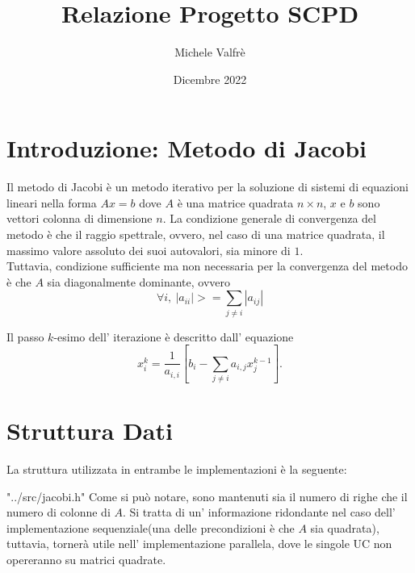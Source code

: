 \documentclass[twocolumn]{article}
\title{Relazione Progetto SCPD}
\date{Dicembre 2022}
\author{Michele Valfrè}
\begin{document}
	\maketitle
	\section{Introduzione: Metodo di Jacobi}
	Il metodo di Jacobi è un metodo iterativo per la soluzione di sistemi di equazioni lineari nella forma $Ax=b$ dove $A$ è una matrice quadrata $n\times n$, $x$ e $b$ sono vettori colonna di dimensione $n$. 
	La condizione generale di convergenza del metodo è che il raggio spettrale, ovvero, nel caso di una matrice quadrata, il massimo valore assoluto dei suoi autovalori, sia minore di $1$.\\
	Tuttavia, condizione sufficiente ma non necessaria per la convergenza del metodo è che $A$ sia diagonalmente dominante, ovvero
	\begin{equation}\label{f1}
		\forall i,\ |a_{ii}| >= \sum_{j \neq i} |a_{ij}| 
	\end{equation}
	
	Il passo $k$-esimo dell' iterazione è descritto dall' equazione
	\begin{equation}\label{f2}
		x^{k}_i = \frac{1}{a_{i,i}}[b_i  - \sum_{j\neq i}a_{i,j}x^{k-1}_j].
	\end{equation}
	\section{Struttura Dati}
	La struttura utilizzata in entrambe le implementazioni è la seguente:
	
	{"../src/jacobi.h"} \label{lin_sys_struct}
	Come si può notare, sono mantenuti sia il numero di righe che il numero di colonne di $A$. Si tratta di un' informazione ridondante nel caso dell' implementazione sequenziale(una delle precondizioni è che $A$ sia quadrata), tuttavia, tornerà utile nell' implementazione parallela, dove le singole UC non opereranno su matrici quadrate.
\end{document}
